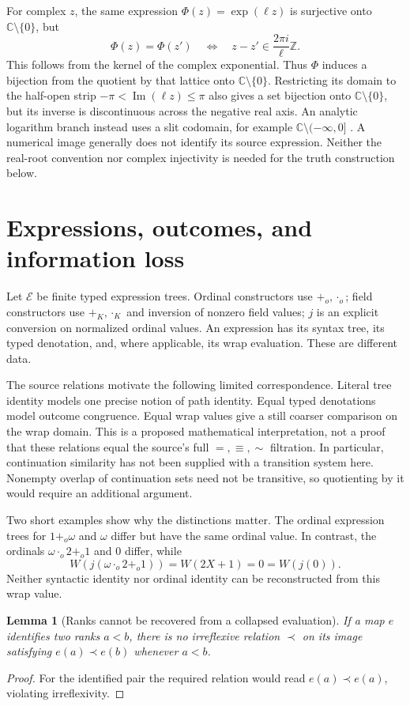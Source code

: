 \documentclass[11pt]{article}
\newtheorem{lemma}[theorem]{Lemma}
\theoremstyle{definition}
\newcommand{\C}{\mathbb C}
\begin{document}
For complex $z$, the same expression $\Phi(z)=\exp(\ell z)$ is surjective onto $\C\setminus\{0\}$, but
\[
\Phi(z)=\Phi(z')\quad\Longleftrightarrow\quad
z-z'\in\frac{2\pi i}{\ell}\mathbb Z.
\]
This follows from the kernel of the complex exponential. Thus $\Phi$ induces a bijection from the quotient by that lattice onto $\C\setminus\{0\}$. Restricting its domain to the half-open strip $-\pi<\operatorname{Im}(\ell z)\le\pi$ also gives a set bijection onto $\C\setminus\{0\}$, but its inverse is discontinuous across the negative real axis. An analytic logarithm branch instead uses a slit codomain, for example $\C\setminus(-\infty,0]$ \cite{nist}. A numerical image generally does not identify its source expression. Neither the real-root convention nor complex injectivity is needed for the truth construction below.

\section{Expressions, outcomes, and information loss}
Let $\mathcal E$ be finite typed expression trees. Ordinal constructors use $+_o,\cdot_o$; field constructors use $+_K,\cdot_K$ and inversion of nonzero field values; $j$ is an explicit conversion on normalized ordinal values. An expression has its syntax tree, its typed denotation, and, where applicable, its wrap evaluation. These are different data.

The source relations motivate the following limited correspondence. Literal tree identity models one precise notion of path identity. Equal typed denotations model outcome congruence. Equal wrap values give a still coarser comparison on the wrap domain. This is a proposed mathematical interpretation, not a proof that these relations equal the source's full $=,\equiv,\sim$ filtration. In particular, continuation similarity has not been supplied with a transition system here. Nonempty overlap of continuation sets need not be transitive, so quotienting by it would require an additional argument.

Two short examples show why the distinctions matter. The ordinal expression trees for $1+_o\omega$ and $\omega$ differ but have the same ordinal value. In contrast, the ordinals $\omega\cdot_o2+_o1$ and $0$ differ, while
\[
W(j(\omega\cdot_o2+_o1))=W(2X+1)=0=W(j(0)).
\]
Neither syntactic identity nor ordinal identity can be reconstructed from this wrap value.

\begin{lemma}[Ranks cannot be recovered from a collapsed evaluation]
If a map $e$ identifies two ranks $a<b$, there is no irreflexive relation $\prec$ on its image satisfying $e(a)\prec e(b)$ whenever $a<b$.
\end{lemma}
\begin{proof}
For the identified pair the required relation would read $e(a)\prec e(a)$, violating irreflexivity.
\end{proof}
\end{document}
